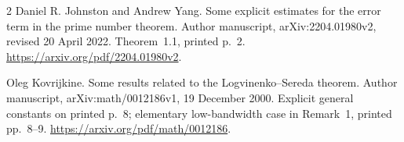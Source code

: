 \documentclass[11pt]{article}
\theoremstyle{remark}\newtheorem{remark}[theorem]{Remark}
\numberwithin{equation}{section}
\begin{document}
\begin{thebibliography}{2}
Daniel R. Johnston and Andrew Yang.
\newblock Some explicit estimates for the error term in the prime number theorem.
\newblock Author manuscript, arXiv:2204.01980v2, revised 20 April 2022.
\newblock Theorem~1.1, printed p.~2.
\newblock \url{https://arxiv.org/pdf/2204.01980v2}.

Oleg Kovrijkine.
\newblock Some results related to the Logvinenko--Sereda theorem.
\newblock Author manuscript, arXiv:math/0012186v1, 19 December 2000.
\newblock Explicit general constants on printed p.~8; elementary low-bandwidth case in Remark~1, printed pp.~8--9.
\newblock \url{https://arxiv.org/pdf/math/0012186}.
\end{thebibliography}
\end{document}
